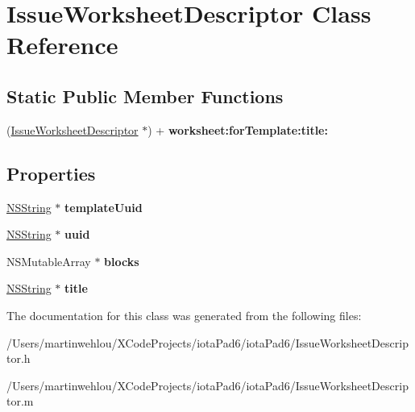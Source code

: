 \hypertarget{interface_issue_worksheet_descriptor}{
\section{IssueWorksheetDescriptor Class Reference}
\label{interface_issue_worksheet_descriptor}
}
\subsection*{Static Public Member Functions}
\begin{DoxyCompactItemize}
\item 
\hypertarget{interface_issue_worksheet_descriptor_ad4c60826d73c6d5d8c98cc8f7eac0273}{
(\hyperlink{interface_issue_worksheet_descriptor}{IssueWorksheetDescriptor} $\ast$) + {\bfseries worksheet:forTemplate:title:}}
\label{interface_issue_worksheet_descriptor_ad4c60826d73c6d5d8c98cc8f7eac0273}

\end{DoxyCompactItemize}
\subsection*{Properties}
\begin{DoxyCompactItemize}
\item 
\hypertarget{interface_issue_worksheet_descriptor_ad6cd86f436211328de6e141cc97d800e}{
\hyperlink{class_n_s_string}{NSString} $\ast$ {\bfseries templateUuid}}
\label{interface_issue_worksheet_descriptor_ad6cd86f436211328de6e141cc97d800e}

\item 
\hypertarget{interface_issue_worksheet_descriptor_a808bcdb7f4a507bbf39d756f7ced1f4e}{
\hyperlink{class_n_s_string}{NSString} $\ast$ {\bfseries uuid}}
\label{interface_issue_worksheet_descriptor_a808bcdb7f4a507bbf39d756f7ced1f4e}

\item 
\hypertarget{interface_issue_worksheet_descriptor_aa8fb6bcbbab795cd77e7c1e38d66c3ef}{
NSMutableArray $\ast$ {\bfseries blocks}}
\label{interface_issue_worksheet_descriptor_aa8fb6bcbbab795cd77e7c1e38d66c3ef}

\item 
\hypertarget{interface_issue_worksheet_descriptor_abd67e08b9d4d175a55f6713c51cb342f}{
\hyperlink{class_n_s_string}{NSString} $\ast$ {\bfseries title}}
\label{interface_issue_worksheet_descriptor_abd67e08b9d4d175a55f6713c51cb342f}

\end{DoxyCompactItemize}


The documentation for this class was generated from the following files:\begin{DoxyCompactItemize}
\item 
/Users/martinwehlou/XCodeProjects/iotaPad6/iotaPad6/IssueWorksheetDescriptor.h\item 
/Users/martinwehlou/XCodeProjects/iotaPad6/iotaPad6/IssueWorksheetDescriptor.m\end{DoxyCompactItemize}
